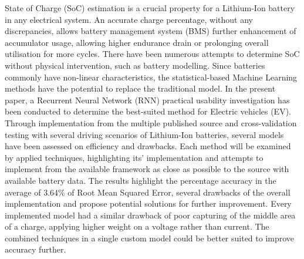 %
{
State of Charge (SoC) estimation is a crucial property for a Lithium-Ion battery in any electrical system.
An accurate charge percentage, without any discrepancies, allows battery management system (BMS) further enhancement of accumulator usage, allowing higher endurance drain or prolonging overall utilisation for more cycles.
There have been numerous attempts to determine SoC without physical intervention, such as battery modelling.
Since batteries commonly have non-linear characteristics, the statistical-based Machine Learning methods have the potential to replace the traditional model.
In the present paper, a Recurrent Neural Network (RNN) practical usability investigation has been conducted to determine the best-suited method for Electric vehicles (EV).
Through implementation from the multiple published source and cross-validation testing with several driving scenarios of Lithium-Ion batteries, several models have been assessed on efficiency and drawbacks.%
Each method will be examined by applied techniques, highlighting its' implementation and attempts to implement from the available framework as close as possible to the source with available battery data.
The results highlight the percentage accuracy in the average of 3.64\% of Root Mean Squared Error, several drawbacks of the overall implementation and propose potential solutions for further improvement.
Every implemented model had a similar drawback of poor capturing of the middle area of a charge, applying higher weight on a voltage rather than current.
The combined techniques in a single custom model could be better suited to improve accuracy further.
}
